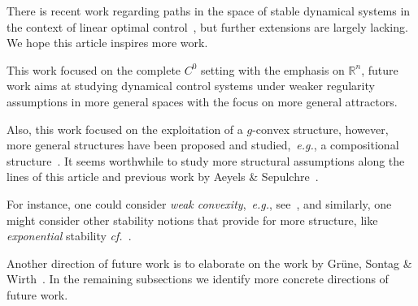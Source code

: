 \documentclass[letterpaper, 10 pt, conference]{ieeeconf}  %
\theoremstyle{mystyle}
\begin{document}
There is recent work regarding paths in the space of stable dynamical systems in the context of linear optimal control~\cite{ref:bu2019lqr,ref:ECCJongeneelKuhn21}, but further extensions are largely lacking. We hope this article inspires more work. 

This work focused on the complete $C^{0}$ setting with the emphasis on $\mathbb{R}^n$, future work aims at studying dynamical control systems under weaker regularity assumptions in more general spaces with the focus on more general attractors. 

Also, this work focused on the exploitation of a $g$-convex structure, however, more general structures have been proposed and studied,~\textit{e.g.}, a compositional structure~\cite{ref:Grune2021}. It seems worthwhile to study more structural assumptions along the lines of this article and previous work by Aeyels \& Sepulchre~\cite{ref:sepulchre1996homogeneous}. {For instance, one could consider \textit{weak convexity},~\textit{e.g.}, see~\cite{davis2019stochastic}, and similarly, one might consider other stability notions that provide for more structure, like \textit{exponential} stability \textit{cf.}~\cite{vidyasagar2022new}. 

Another direction of future work is to elaborate on the work by Gr\"une, Sontag \& Wirth~\cite{grune1999asymptotic}. 
In the remaining subsections we identify more concrete directions of future work. 
}
\end{document}
